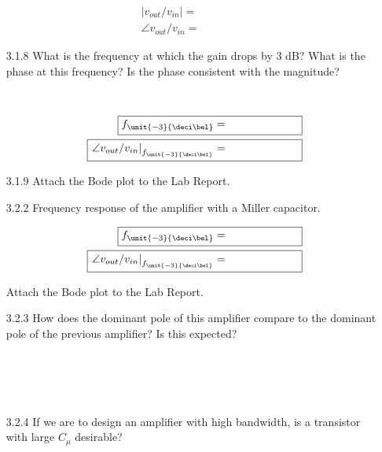 \documentclass{article}
\begin{document}
\begin{enumerate}
	\begin{align*}
    		\boxed{\left|v_{out}/v_{in}\right| = ~~~~~~~~~~~~~~~~~~~~ } \\
    		\boxed{\angle v_{out}/v_{in} = ~~~~~~~~~~~~~~~~~~~~ }
  	\end{align*}

	\item[3.1.8] What is the frequency at which the gain drops by 3 dB? What is the phase at this frequency? Is the phase consistent with the magnitude? \\~\\~\\

	\begin{align*}
    		\boxed{f_{\unit{-3}{\deci\bel}} = ~~~~~~~~~~~~~~~~~~~~ } \\
    		\boxed{\left.\angle v_{out}/v_{in}\right|_{f_{\unit{-3}{\deci\bel}}} = ~~~~~~~~~~~~~~~~~~~~ }
  	\end{align*}

	\item[3.1.9] Attach the Bode plot to the Lab Report.

	\item[3.2.2] Frequency response of the amplifier with a Miller capacitor. 

	\begin{align*}
    		\boxed{f_{\unit{-3}{\deci\bel}} = ~~~~~~~~~~~~~~~~~~~~ } \\
    		\boxed{\left.\angle v_{out}/v_{in}\right|_{f_{\unit{-3}{\deci\bel}}} = ~~~~~~~~~~~~~~~~~~~~ }
  	\end{align*}

	Attach the Bode plot to the Lab Report.

	\item[3.2.3] How does the dominant pole of this amplifier compare to the dominant pole of the previous amplifier? Is this expected? \\~\\~\\~\\~\\

	\item[3.2.4] If we are to design an amplifier with high bandwidth, is a transistor with large $C_{\mu}$ desirable? \\~\\~\\~\\~\\


\end{enumerate}
\end{document}
